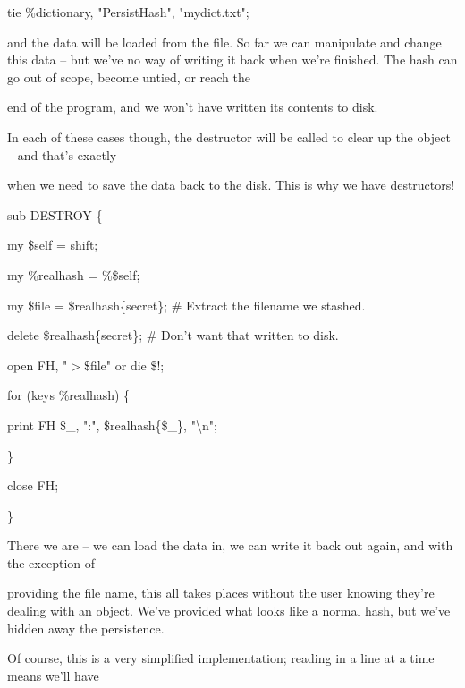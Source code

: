 \documentclass[a4paper,11pt]{book}
\begin{document}
\noindent tie \%dictionary, "PersistHash", "mydict.txt";

\noindent 

\noindent and the data will be loaded from the file. So far we can manipulate and change this data -- but we've no way of writing it back when we're finished. The hash can go out of scope, become untied, or reach the

\noindent end of the program, and we won't have written its contents to disk.

\noindent 

\noindent 

\noindent In each of these cases though, the destructor will be called to clear up the object -- and that's exactly

\noindent when we need to save the data back to the disk. This is why we have destructors!

\noindent 

\noindent 

\noindent sub DESTROY \{

\noindent my \$self = shift;

\noindent my \%realhash = \%\$self;

\noindent my \$file = \$realhash\{\underbar{  }secret\underbar{  }\}; \# Extract the filename we stashed.

\noindent delete \$realhash\{\underbar{  }secret\underbar{  }\}; \# Don't want that written to disk.

\noindent open FH, "$>$\$file" or die \$!;

\noindent for (keys \%realhash) \{

\noindent print FH \$\_, ":", \$realhash\{\$\_\}, "\textbackslash n";

\noindent \}

\noindent close FH;

\noindent \}

\noindent 

\noindent There we are -- we can load the data in, we can write it back out again, and with the exception of

\noindent providing the file name, this all takes places without the user knowing they're dealing with an object. We've provided what looks like a normal hash, but we've hidden away the persistence.

\noindent 

\noindent Of course, this is a very simplified implementation; reading in a line at a time means we'll have
\end{document}
